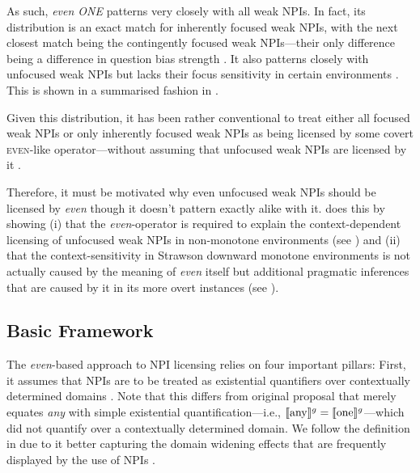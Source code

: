 As such, \textit{even \MakeUppercase{one}} patterns very closely with all weak NPIs. In fact, its distribution is an exact match for inherently focused weak NPIs, with the next closest match being the contingently focused weak NPIs---their only difference being a difference in question bias strength \parencite{Jeong2021,Jeong2022}. It also patterns closely with unfocused weak NPIs but lacks their focus sensitivity in certain environments \parencite{Crnic2011,Crnic2014-dogma,Crnic2014-nm}. This is shown in a summarised fashion in .
\begin{table}[!htb]
\end{table}

Given this distribution, it has been rather conventional to treat either all focused weak NPIs or only inherently focused weak NPIs as being licensed by some covert {\scshape even}-like operator---without assuming that unfocused weak NPIs are licensed by it \parencite[see, amongst many others,][]{Heim1984,Krifka1995,Guerzoni2003,Guerzoni2004,Chierchia2013}.

Therefore, it must be motivated why even unfocused weak NPIs should be licensed by \textit{even} though it doesn't pattern exactly alike with it. \textcite{Crnic2011,Crnic2014-dogma,Crnic2014-nm} does this by showing (i) that the \textit{even}-operator is required to explain the context-dependent licensing of unfocused weak NPIs in non-monotone environments (see ) and (ii) that the context-sensitivity in Strawson downward monotone environments is not actually caused by the meaning of \textit{even} itself but additional pragmatic inferences that are caused by it in its more overt instances (see ).

\subsection{Basic Framework}
The \textit{even}-based approach to NPI licensing relies on four important pillars: First, it assumes that NPIs are to be treated as existential quantifiers over contextually determined domains \parencite{Krifka1995,Chierchia2013}. 
\ex
{}
\xe
Note that this differs from  original proposal that merely equates \textit{any} with simple existential quantification---i.e., $\llbracket\text{any}\rrbracket^{g}=\llbracket\text{one}\rrbracket^{g}$---which did not quantify over a contextually determined domain. We follow the definition in  due to it better capturing the domain widening effects that are frequently displayed by the use of NPIs \parencite[see][]{Krifka1995}.

